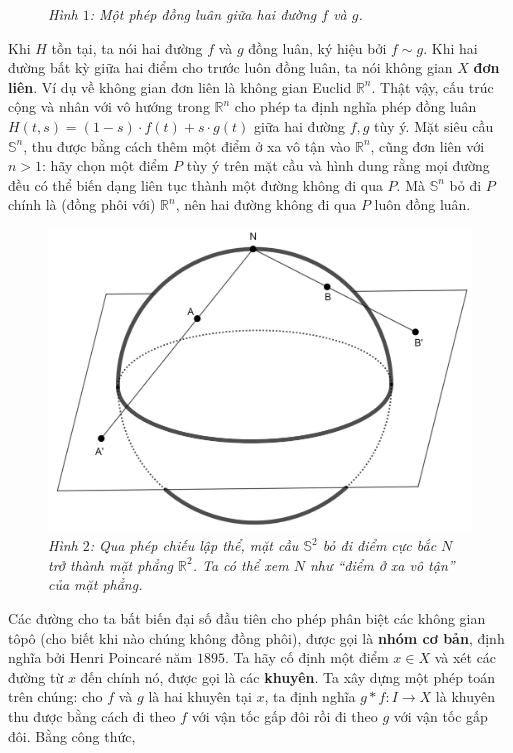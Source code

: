 \begin{multicols}{2}
\begin{figure}[H]
		\caption{\small\textit{\color{duongvaotoanhoc}Hình $1$: Một phép đồng luân giữa hai đường $f$ và $g$.}}
		\vspace*{-10pt}
	\end{figure}
	Khi $H$ tồn tại, ta nói hai đường $f$ và $g$ đồng luân, ký hiệu bởi $f \sim g$. Khi hai đường bất kỳ giữa hai điểm cho trước luôn đồng luân, ta nói không gian $X$ {\bf\color{duongvaotoanhoc} đơn liên}. Ví dụ về không gian đơn liên là không gian Euclid $\mathbb{R}^n$. Thật vậy, cấu trúc cộng và nhân với vô hướng trong $\mathbb{R}^n$ cho phép ta định nghĩa phép đồng luân $H(t,s) = (1-s) \cdot f(t) + s \cdot g(t)$ giữa hai đường $f, g$ tùy ý. Mặt  siêu cầu $\mathbb{S}^n$, thu được bằng cách thêm một điểm ở xa vô tận vào $\mathbb{R}^n$, cũng đơn liên với $n > 1$: hãy chọn một điểm $P$ tùy ý trên mặt cầu và hình dung rằng mọi đường đều có thể biến dạng liên tục thành một đường không đi qua $P$. Mà $\mathbb{S}^n$ bỏ đi $P$ chính là (đồng phôi với) $\mathbb{R}^n$, nên hai đường không đi qua $P$ luôn đồng luân.
		\begin{figure}[H]
		\vspace*{-5pt}
		\centering
		\captionsetup{labelformat= empty, justification=centering}
		\includegraphics[width= 0.9\linewidth]{h2.png}
		\caption{\small\textit{\color{duongvaotoanhoc}Hình $2$: Qua phép chiếu lập thể, mặt cầu $\mathbb{S}^2$ bỏ đi điểm cực bắc $N$ trở thành mặt phẳng $\mathbb{R}^2$. Ta có thể xem $N$ như ``điểm ở xa vô tận'' của mặt phẳng.}}
		\vspace*{-10pt}
	\end{figure}
	Các đường cho ta bất biến đại số đầu tiên cho phép phân biệt các không gian tôpô (cho biết khi nào chúng không đồng phôi), được gọi là {\bf\color{duongvaotoanhoc} nhóm cơ bản}, định nghĩa bởi Henri Poincaré năm $1895$. Ta hãy cố định một điểm $x \in X$ và xét các đường từ $x$ đến chính nó, được gọi là các {\bf\color{duongvaotoanhoc} khuyên}. Ta xây dựng một phép toán trên chúng: cho $f$ và $g$ là hai khuyên tại $x$, ta định nghĩa $g \ast f: I \to X$ là khuyên thu được bằng cách đi theo $f$ với vận tốc gấp đôi rồi đi theo $g$ với vận tốc gấp đôi. Bằng công thức, 

\end{multicols}
